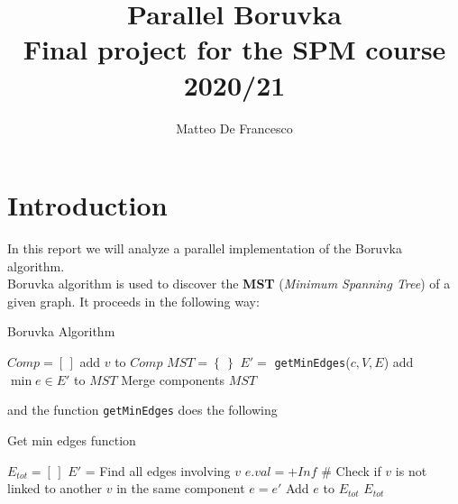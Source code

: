 \documentclass[notitlepage]{article}
\title{Parallel Boruvka\\{\normalsize Final project for the SPM course 2020/21}}
\author{Matteo De Francesco}
\date{}
\begin{document}
\maketitle

\thispagestyle{empty}

\tableofcontents

\newpage


\section{Introduction}

In this report we will analyze a parallel implementation of the Boruvka algorithm.\\
Boruvka algorithm is used to discover the {\bf MST} (\textit{Minimum Spanning Tree}) of a given graph. It proceeds in the following way:

\begin{algorithm}[H]
  \caption{Boruvka Algorithm}
  \begin{algorithmic}[1]
      \State $Comp = \left[\,\right]$
        \State add $v$ to $Comp$
      \EndFor
      \State $MST = \left\{\,\right\}$
         \label{alglin:foreach}
          \State $E' =$ \texttt{getMinEdges}($c, V, E$)
          \State add $\min e \in E'$ to $MST$
        \EndFor
        \State Merge components \label{alglin:merge}
      \EndWhile
      \State \Return $MST$
    \EndFunction
  \end{algorithmic}
\end{algorithm}

and the function \texttt{getMinEdges} does the following

\begin{algorithm}[H]
  \caption{Get min edges function}
  \begin{algorithmic}[1]
      \State $E_{tot} = \left[\,\right]$
        \State $E'$ = Find all edges involving $v$
        \State $e.val = +Inf$
          \State \# Check if $v$ is not linked to another $v$ in the same component
            \State $e = e'$
          \EndIf
        \EndFor
        \State Add $e$ to $E_{tot}$
      \EndFor
      \State \Return $E_{tot}$
    \EndFunction
  \end{algorithmic}
\end{algorithm}
\end{document}
